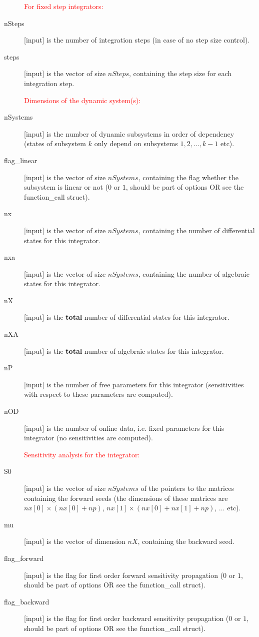 \documentclass{report}
\begin{document}
\begin{description}
\item[] \textcolor{red}{For fixed step integrators:}
\item[nSteps] [input] is the number of integration steps (in case of no step size control).
\item[steps] [input] is the vector of size $nSteps$, containing the step size for each integration step.
\item[] \textcolor{red}{Dimensions of the dynamic system(s):}
\item[nSystems] [input] is the number of dynamic subsystems in order of dependency (states of subsystem $k$ only depend on subsystems $1,2,\ldots, k-1$ etc).
\item[flag\_linear] [input] is the vector of size $nSystems$, containing the flag whether the subsystem is linear or not ($0$ or $1$, should be part of options OR see the function\_call struct).
\item[nx] [input] is the vector of size $nSystems$, containing the number of differential states for this integrator.
\item[nxa] [input] is the vector of size $nSystems$, containing the number of algebraic states for this integrator.
\item[nX] [input] is the {\bf total} number of differential states for this integrator.
\item[nXA] [input] is the {\bf total} number of algebraic states for this integrator.
\item[nP] [input] is the number of free parameters for this integrator (sensitivities with respect to these parameters are computed).
\item[nOD] [input] is the number of online data, i.e. fixed parameters for this integrator (no sensitivities are computed).
\item[] \textcolor{red}{Sensitivity analysis for the integrator:}
\item[S0] [input] is the vector of size $nSystems$ of the pointers to the matrices containing the forward seeds (the dimensions of these matrices are $nx[0] \times (nx[0]+np)$, $nx[1] \times (nx[0]+nx[1]+np)$, $\ldots$ etc).
\item[mu] [input] is the vector of dimension $nX$, containing the backward seed.
\item[flag\_forward] [input] is the flag for first order forward sensitivity propagation ($0$ or $1$, should be part of options OR see the function\_call struct).
\item[flag\_backward] [input] is the flag for first order backward sensitivity propagation ($0$ or $1$, should be part of options OR see the function\_call struct).

\end{description}
\end{document}
